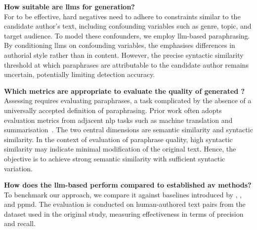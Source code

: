 \begin{questions}
    \item \textbf{How suitable are \acp{llm} for \imp{} generation?} \label{enum:rq1} \hfill \\
    For \imps{} to be effective, hard negatives need to adhere to constraints similar to the candidate author's text, including confounding variables such as genre, topic, and target audience.
    To model these confounders, we employ \ac{llm}-based paraphrasing. 
    By conditioning \acp{llm} on confounding variables, the \impAppr{} emphasises differences in authorial style rather than in content. 
    However, the precise syntactic similarity threshold at which paraphrases are attributable to the candidate author remains uncertain, potentially limiting detection accuracy. 
   
    \item \textbf{Which metrics are appropriate to evaluate the quality of generated \imps{}?} \label{enum:rq2} \hfill \\
    Assessing \imps{} requires evaluating paraphrases, a task complicated by the absence of a universally accepted definition of paraphrasing. 
    Prior work often adopts evaluation metrics from adjacent \ac{nlp} tasks such as machine translation and summarisation~\citep{gohsen_captions_2023}. 
    The two central dimensions are semantic similarity and syntactic similarity. 
    In the context of evaluation of paraphrase quality, high syntactic similarity may indicate minimal modification of the original text.
    Hence, the objective is to achieve strong semantic similarity with sufficient syntactic variation. 

    \item \textbf{How does the \ac{llm}-based \impAppr{} perform compared to established \ac{av} methods?} \label{enum:rq3} \hfill \\
    To benchmark our approach, we compare it against baselines introduced by \citet{koppel_determining_2014}, \unmasking{}, and \acs{ppmd}.
    The evaluation is conducted on human-authored text pairs from the \dataStudent{} dataset used in the original study, measuring effectiveness in terms of precision and recall.
    
\end{questions}

\newpage
